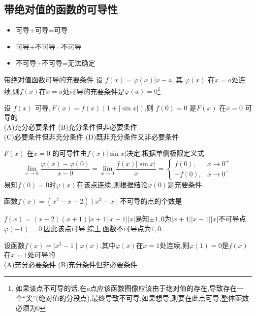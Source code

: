 \documentclass[8pt a4paper, oneside, UTF8]{ctexbook}  %
\begin{document}
\begin{sloppypar}
    \subsection{带绝对值的函数的可导性}
    \begin{itemize}
        \item 可导+可导=可导
        \item 可导+不可导=不可导
        \item 不可导+不可导=无法确定
    \end{itemize}
    \begin{conclusion}{带绝对值函数可导的充要条件}{}
        设 $f(x)=\varphi(x)\left|x-a\right|$,其 $\varphi(x)$ 在$x=a$处连续,则$f\left(x\right)$在$x=a$处可导的充要条件是$\varphi\left(a\right)=0$\footnote{如果该点不可导的话,在$a$点应该函数图像应该由于绝对值的存在,导致存在一个“尖”(绝对值的分段点),最终导致不可导,如果想导,则要在此点可导,整体函数必须为0}
    \end{conclusion}
    \begin{problem}
    设 $f(x)$ 可导$,F(x)=f(x)(1+|\sin x|)$,则 $f(0)=0$ 是$F(x)$ 在$x=0$ 可导的\\
    (A)充分必要条件 \quad (B)充分条件但非必要条件\\
    (C)必要条件但非充分条件 \quad (D)既非充分条件又非必要条件
    \end{problem}
    \begin{solution}
        $F(x)$ 在$x=0$ 的可导性由$f(x)|\sin x|$决定,根据单侧极限定义式
        $$\lim\limits_{x\to0}\frac{\varphi(x)-\varphi(0)}{x-0}=\lim\limits_{x\to0}\frac{f(x)\left|\sin x\right|}{x}=\begin{cases}f(0) ,&x\to0^+\\[2ex]-f(0) ,&x\to0^-\end{cases}$$
        易知$f(0)=0$时$\varphi(x)$在该点连续,则根据结论$\varphi(0)$是充要条件.
    \end{solution}
    \begin{problem}
    函数$f(x)=(x^2-x-2)\mid x^3-x\mid$不可导的点的个数是
    \end{problem}
    \begin{solution}
        $f(x)=(x-2)(x+1)|x+1||x-1||x|$易知$\pm 1,0$为$|x+1||x-1||x|$不可导点.$\varphi(-1) = 0$,因此该点可导.综上,函数不可导点为$1,0$.
    \end{solution}
    \begin{problem}
    设函数$f(x)=\mid x^3-1\mid\varphi(x)$,其中$\varphi(x)$在$x=1$处连续,则$\varphi(1)=0$是$f(x)$在$x=1$处可导的 \\
    (A)充分必要条件 \quad (B)充分条件但非必要条件\\

\end{problem}
\end{sloppypar}
\end{document}
